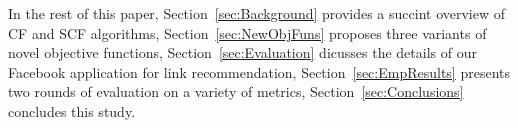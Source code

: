 
In the rest of this paper, Section~\ref{sec:Background} provides a succint overview 
of CF and SCF algorithms, Section~\ref{sec:NewObjFuns} proposes 
three variants of novel objective functions, Section~\ref{sec:Evaluation} dicusses the details 
of our Facebook application for link recommendation, Section~\ref{sec:EmpResults}
presents two rounds of evaluation on a variety of metrics,
Section~\ref{sec:Conclusions} concludes this study.



